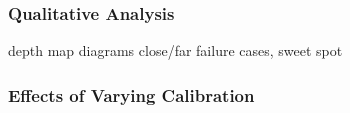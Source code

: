 \clearpage


\subsubsection{Qualitative Analysis}
depth map diagrams
close/far failure cases, sweet spot

\subsubsection{Effects of Varying Calibration}